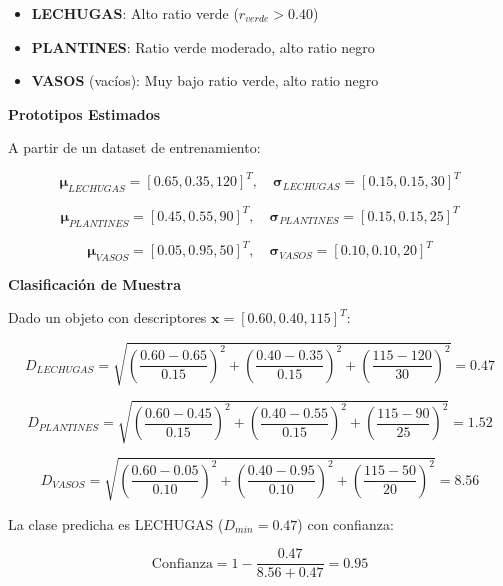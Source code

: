 \begin{itemize}
\item \textbf{LECHUGAS}: Alto ratio verde ($r_{verde} > 0.40$)
\item \textbf{PLANTINES}: Ratio verde moderado, alto ratio negro
\item \textbf{VASOS} (vacíos): Muy bajo ratio verde, alto ratio negro
\end{itemize}

\textbf{Prototipos Estimados}

A partir de un dataset de entrenamiento:

\begin{equation}
\boldsymbol{\mu}_{LECHUGAS} = [0.65, 0.35, 120]^T, \quad \boldsymbol{\sigma}_{LECHUGAS} = [0.15, 0.15, 30]^T
\end{equation}

\begin{equation}
\boldsymbol{\mu}_{PLANTINES} = [0.45, 0.55, 90]^T, \quad \boldsymbol{\sigma}_{PLANTINES} = [0.15, 0.15, 25]^T
\end{equation}

\begin{equation}
\boldsymbol{\mu}_{VASOS} = [0.05, 0.95, 50]^T, \quad \boldsymbol{\sigma}_{VASOS} = [0.10, 0.10, 20]^T
\end{equation}

\textbf{Clasificación de Muestra}

Dado un objeto con descriptores $\mathbf{x} = [0.60, 0.40, 115]^T$:

\begin{equation}
D_{LECHUGAS} = \sqrt{\left(\frac{0.60-0.65}{0.15}\right)^2 + \left(\frac{0.40-0.35}{0.15}\right)^2 + \left(\frac{115-120}{30}\right)^2} = 0.47
\end{equation}

\begin{equation}
D_{PLANTINES} = \sqrt{\left(\frac{0.60-0.45}{0.15}\right)^2 + \left(\frac{0.40-0.55}{0.15}\right)^2 + \left(\frac{115-90}{25}\right)^2} = 1.52
\end{equation}

\begin{equation}
D_{VASOS} = \sqrt{\left(\frac{0.60-0.05}{0.10}\right)^2 + \left(\frac{0.40-0.95}{0.10}\right)^2 + \left(\frac{115-50}{20}\right)^2} = 8.56
\end{equation}

La clase predicha es LECHUGAS ($D_{min} = 0.47$) con confianza:

\begin{equation}
\text{Confianza} = 1 - \frac{0.47}{8.56 + 0.47} = 0.95
\end{equation}

